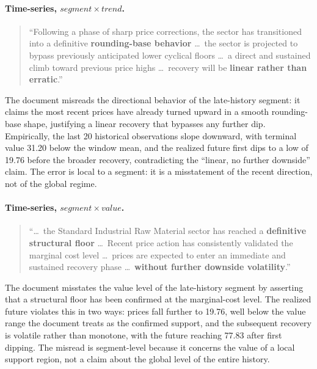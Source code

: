 \documentclass[]{servicenow}
\begin{document}
\begin{tcolorbox}[title=Task B: Standard Industrial Raw Material price, breakable]
\inputminted[fontsize=\scriptsize, breaklines, breaksymbolleft={}, breaksymbolright={}]{markdown}{Distractors/22.txt}
\end{tcolorbox}

\clearpage
\paragraph{Time-series, $\mathit{segment}\!\times\!\mathit{trend}$.}
\begin{quote}\small
``Following a phase of sharp price corrections, the sector has transitioned into a definitive \textbf{rounding-base behavior} \ldots\ the sector is projected to bypass previously anticipated lower cyclical floors \ldots\ a direct and sustained climb toward previous price highs \ldots\ recovery will be \textbf{linear rather than erratic}.''
\end{quote}
The document misreads the directional behavior of the late-history segment: it claims the most recent prices have already turned upward in a smooth rounding-base shape, justifying a linear recovery that bypasses any further dip. Empirically, the last 20 historical observations slope downward, with terminal value 31.20 below the window mean, and the realized future first dips to a low of 19.76 before the broader recovery, contradicting the ``linear, no further downside'' claim. The error is local to a segment: it is a misstatement of the recent direction, not of the global regime.

\paragraph{Time-series, $\mathit{segment}\!\times\!\mathit{value}$.}
\begin{quote}\small
``\ldots\ the Standard Industrial Raw Material sector has reached a \textbf{definitive structural floor} \ldots\ Recent price action has consistently validated the marginal cost level \ldots\ prices are expected to enter an immediate and sustained recovery phase \ldots\ \textbf{without further downside volatility}.''
\end{quote}
The document misstates the value level of the late-history segment by asserting that a structural floor has been confirmed at the marginal-cost level. The realized future violates this in two ways: prices fall further to 19.76, well below the value range the document treats as the confirmed support, and the subsequent recovery is volatile rather than monotone, with the future reaching 77.83 after first dipping. The misread is segment-level because it concerns the value of a local support region, not a claim about the global level of the entire history.
\end{document}
